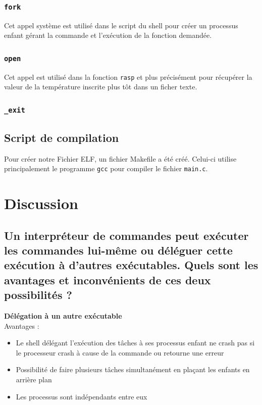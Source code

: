 \documentclass[10pt,a4paper]{article}
\begin{document}
\subsubsection{\texttt{fork}}
Cet appel système est utilisé dans le script du shell pour créer un processus enfant gérant la commande et l'exécution de la fonction demandée. 

\subsubsection{\texttt{open}}
Cet appel est utilisé dans la fonction \texttt{rasp} et plus précisément pour récupérer la valeur de la température inscrite plus tôt dans un ficher texte. 

\subsubsection{\texttt{\_exit}}


\subsection{Script de compilation}
Pour créer notre Fichier ELF, un fichier Makefile a été créé. Celui-ci utilise principalement le programme \texttt{gcc} pour compiler le fichier \texttt{main.c}. 

\section{Discussion}
\subsection*{Un interpréteur de commandes peut exécuter les commandes lui-même ou déléguer cette exécution à d'autres exécutables. Quels sont les avantages et inconvénients de ces deux possibilités ?}

\textbf{Délégation à un autre exécutable\\}
Avantages :
\begin{itemize}
\item Le shell délégant l'exécution des tâches à ses processus enfant ne crash pas si le processeur crash à cause de la commande ou retourne une erreur 

\item Possibilité de faire plusieurs tâches simultanément en plaçant les enfants en arrière plan

\item Les processus sont indépendants entre eux
\end{itemize}
\end{document}
